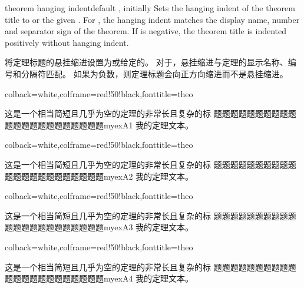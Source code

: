 \begin{docTcbKey}[][doc new=2020-10-21]{theorem hanging indent}{}{default , initially }
Sets the hanging indent of the theorem title to  or the
given .
For , the hanging indent matches the display name, number and
separator sign of the theorem.
If  is negative, the theorem title is indented positively
without hanging indent.

将定理标题的悬挂缩进设置为或给定的。 对于，悬挂缩进与定理的显示名称、编号和分隔符匹配。 如果为负数，则定理标题会向正方向缩进而不是悬挂缩进。

\begin{dispExample}
%
{colback=white,colframe=red!50!black,fonttitle=\bfseries}{theo}
\begin{sometheorem}{这是一个相当简短且几乎为空的定理的非常长且复杂的标%
题题题题题题题题题题题题题题题题题题题题题题}{myexA1}
我的定理文本。
\end{sometheorem}
\end{dispExample}
\begin{dispExample}
%
{colback=white,colframe=red!50!black,fonttitle=\bfseries}{theo}
\begin{sometheorem}[theorem hanging indent=5mm]{这是一个相当简短且几乎为空的定理的非常长且复杂的标%
    题题题题题题题题题题题题题题题题题题题题题题}{myexA2}
我的定理文本。
\end{sometheorem}
\end{dispExample}
\begin{dispExample}
%
{colback=white,colframe=red!50!black,fonttitle=\bfseries}{theo}
\begin{sometheorem}[theorem hanging indent=0pt]{这是一个相当简短且几乎为空的定理的非常长且复杂的标%
    题题题题题题题题题题题题题题题题题题题题题题}{myexA3}
我的定理文本。
\end{sometheorem}
\end{dispExample}

\begin{dispExample}
%
{colback=white,colframe=red!50!black,fonttitle=\bfseries}{theo}
\begin{sometheorem}[theorem hanging indent=-5mm]{这是一个相当简短且几乎为空的定理的非常长且复杂的标%
    题题题题题题题题题题题题题题题题题题题题题题}{myexA4}
我的定理文本。
\end{sometheorem}
\end{dispExample}
\end{docTcbKey}



